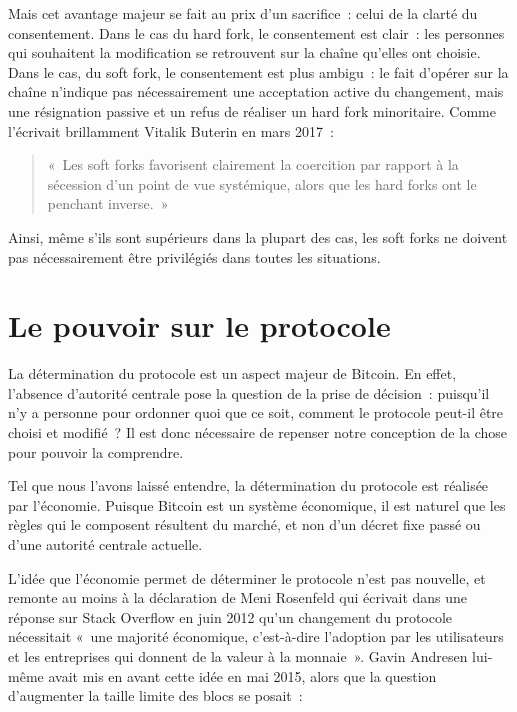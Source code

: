 Mais cet avantage majeur se fait au prix d'un sacrifice~: celui de la clarté du consentement. Dans le cas du hard fork, le consentement est clair~: les personnes qui souhaitent la modification se retrouvent sur la chaîne qu'elles ont choisie. Dans le cas, du soft fork, le consentement est plus ambigu~: le fait d'opérer sur la chaîne n'indique pas nécessairement une acceptation active du changement, mais une résignation passive et un refus de réaliser un hard fork minoritaire. Comme l'écrivait brillamment Vitalik Buterin en mars 2017~:

\begin{quote}
«~Les soft forks favorisent clairement la coercition par rapport à la sécession d'un point de vue systémique, alors que les hard forks ont le penchant inverse.~»
\end{quote} %

Ainsi, même s'ils sont supérieurs dans la plupart des cas, les soft forks ne doivent pas nécessairement être privilégiés dans toutes les situations.

\section*{Le pouvoir sur le protocole} %

La détermination du protocole est un aspect majeur de Bitcoin. En effet, l'absence d'autorité centrale pose la question de la prise de décision~: puisqu'il n'y a personne pour ordonner quoi que ce soit, comment le protocole peut-il être choisi et modifié~? Il est donc nécessaire de repenser notre conception de la chose pour pouvoir la comprendre.

Tel que nous l'avons laissé entendre, la détermination du protocole est réalisée par l'économie. Puisque Bitcoin est un système économique, il est naturel que les règles qui le composent résultent du marché, et non d'un décret fixe passé ou d'une autorité centrale actuelle.

L'idée que l'économie permet de déterminer le protocole n'est pas nouvelle, et remonte au moins à la déclaration de Meni Rosenfeld qui écrivait dans une réponse sur Stack Overflow en juin 2012 qu'un changement du protocole nécessitait «~une majorité économique, c'est-à-dire l'adoption par les utilisateurs et les entreprises qui donnent de la valeur à la monnaie~». Gavin Andresen lui-même avait mis en avant cette idée en mai 2015, alors que la question d'augmenter la taille limite des blocs se posait~: %

